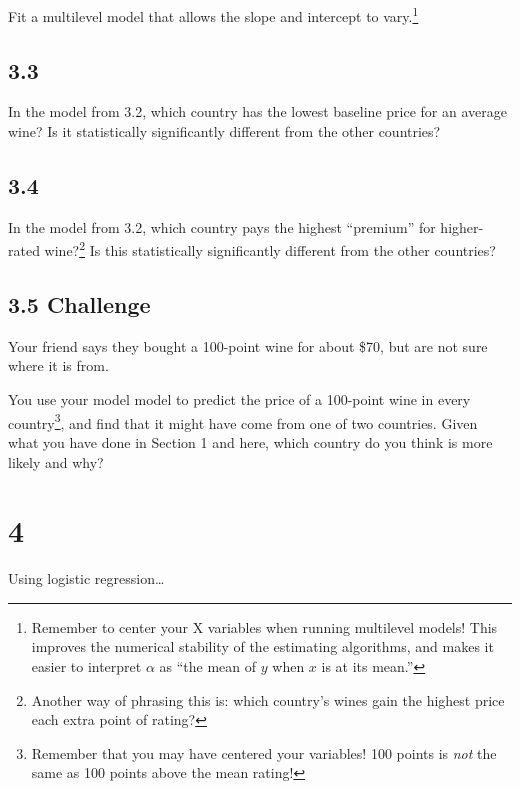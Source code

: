 \documentclass[]{tufte-handout}
\begin{document}
Fit a multilevel model that allows the slope and intercept to
vary.\footnote{Remember to center your X variables when running
  multilevel models! This improves the numerical stability of the
  estimating algorithms, and makes it easier to interpret \(\alpha\) as
  ``the mean of \(y\) when \(x\) is at its mean.''}

\hypertarget{section-9}{%
\subsection{3.3}\label{section-9}}

In the model from 3.2, which country has the lowest baseline price for
an average wine? Is it statistically significantly different from the
other countries?

\hypertarget{section-10}{%
\subsection{3.4}\label{section-10}}

In the model from 3.2, which country pays the highest ``premium'' for
higher-rated wine?\footnote{Another way of phrasing this is: which
  country's wines gain the highest price each extra point of rating?} Is
this statistically significantly different from the other countries?

\hypertarget{challenge-1}{%
\subsection{\texorpdfstring{3.5
\textbf{Challenge}}{3.5 Challenge}}\label{challenge-1}}

Your friend says they bought a 100-point wine for about \$70, but are
not sure where it is from.

You use your model model to predict the price of a 100-point wine in
every country\footnote{Remember that you may have centered your
  variables! 100 points is \emph{not} the same as 100 points above the
  mean rating!}, and find that it might have come from one of two
countries. Given what you have done in Section 1 and here, which country
do you think is more likely and why?

\hypertarget{section-11}{%
\section{4}\label{section-11}}

Using logistic regression\ldots{}
\end{document}
